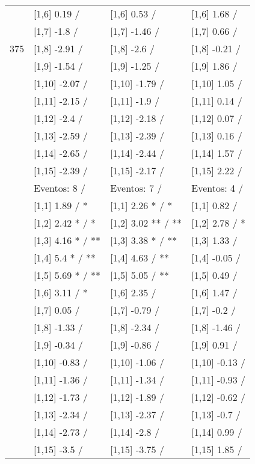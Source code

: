 \begin{table}
\begin{tabular}[t]{llll}
 & {}[1,6] 0.19  / & {}[1,6] 0.53  / & {}[1,6] 1.68  /\\
 & {}[1,7] -1.8  / & {}[1,7] -1.46  / & {}[1,7] 0.66  /\\
375 & {}[1,8] -2.91  / & {}[1,8] -2.6  / & {}[1,8] -0.21  /\\
\addlinespace
 & {}[1,9] -1.54  / & {}[1,9] -1.25  / & {}[1,9] 1.86  /\\
 & {}[1,10] -2.07  / & {}[1,10] -1.79  / & {}[1,10] 1.05  /\\
 & {}[1,11] -2.15  / & {}[1,11] -1.9  / & {}[1,11] 0.14  /\\
 & {}[1,12] -2.4  / & {}[1,12] -2.18  / & {}[1,12] 0.07  /\\
 & {}[1,13] -2.59  / & {}[1,13] -2.39  / & {}[1,13] 0.16  /\\
\addlinespace
 & {}[1,14] -2.65  / & {}[1,14] -2.44  / & {}[1,14] 1.57  /\\
 & {}[1,15] -2.39  / & {}[1,15] -2.17  / & {}[1,15] 2.22  /\\
 & Eventos:  8 / & Eventos:  7 / & Eventos:  4 /\\
 & {}[1,1] 1.89  / * & {}[1,1] 2.26 * / * & {}[1,1] 0.82  /\\
 & {}[1,2] 2.42 * / * & {}[1,2] 3.02 ** / ** & {}[1,2] 2.78  / *\\
\addlinespace
 & {}[1,3] 4.16 * / ** & {}[1,3] 3.38 * / ** & {}[1,3] 1.33  /\\
 & {}[1,4] 5.4 * / ** & {}[1,4] 4.63  / ** & {}[1,4] -0.05  /\\
 & {}[1,5] 5.69 * / ** & {}[1,5] 5.05  / ** & {}[1,5] 0.49  /\\
 & {}[1,6] 3.11  / * & {}[1,6] 2.35  / & {}[1,6] 1.47  /\\
 & {}[1,7] 0.05  / & {}[1,7] -0.79  / & {}[1,7] -0.2  /\\
\addlinespace
500 & {}[1,8] -1.33  / & {}[1,8] -2.34  / & {}[1,8] -1.46  /\\
 & {}[1,9] -0.34  / & {}[1,9] -0.86  / & {}[1,9] 0.91  /\\
 & {}[1,10] -0.83  / & {}[1,10] -1.06  / & {}[1,10] -0.13  /\\
 & {}[1,11] -1.36  / & {}[1,11] -1.34  / & {}[1,11] -0.93  /\\
 & {}[1,12] -1.73  / & {}[1,12] -1.89  / & {}[1,12] -0.62  /\\
\addlinespace
 & {}[1,13] -2.34  / & {}[1,13] -2.37  / & {}[1,13] -0.7  /\\
 & {}[1,14] -2.73  / & {}[1,14] -2.8  / & {}[1,14] 0.99  /\\
 & {}[1,15] -3.5  / & {}[1,15] -3.75  / & {}[1,15] 1.85  /\\
\bottomrule
\end{tabular}
\end{table}
